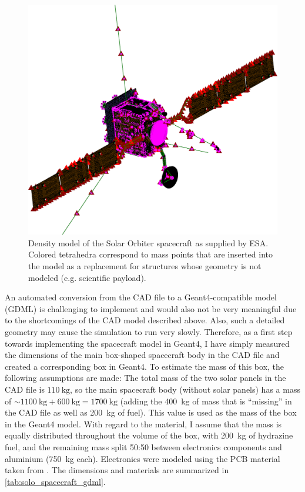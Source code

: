 \begin{figure}
	\centering
	\includegraphics[width=0.7\linewidth]{images/solo_spacecraft_model}
	\caption[Density model of the Solar Orbiter spacecraft]{Density model of the Solar Orbiter spacecraft as supplied by ESA. Colored tetrahedra correspond to mass points that are inserted into the model as a replacement for structures whose geometry is not modeled (e.g. scientific payload).}
	\label{fig:solo_spacecraft_model}
\end{figure}

An automated conversion from the \ac{CAD} file to a \ac{Geant4}-compatible model (GDML) is challenging to implement and would also not be very meaningful due to the shortcomings of the \ac{CAD} model described above. Also, such a detailed geometry may cause the simulation to run very slowly.
Therefore, as a first step towards implementing the spacecraft model in \ac{Geant4}, I have simply measured the dimensions of the main box-shaped spacecraft body in the \ac{CAD} file and created a corresponding box in \ac{Geant4}. To estimate the mass of this box, the following assumptions are made: 
The total mass of the two solar panels in the \ac{CAD} file is $\SI{110}{\kilo\gram}$, so the main spacecraft body (without solar panels) has a mass of $\sim\SI{1100}{\kilogram} + \SI{600}{\kilogram} = \SI{1700}{\kilogram}$ (adding the \SI{400}{\kilogram} of mass that is ``missing'' in the \ac{CAD} file as well as \SI{200}{\kilogram} of fuel). This value is used as the mass of the box in the \ac{Geant4} model.
With regard to the material, I assume that the mass is equally distributed throughout the volume of the box, with \SI{200}{\kilogram} of hydrazine fuel, and the remaining mass split 50:50 between electronics components and aluminium (\SI{750}{\kilogram} each). Electronics were modeled using the \ac{PCB} material taken from \citet{Appel-2018,Appel-2018-PhD}.
The dimensions and materials are summarized in \autoref{tab:solo_spacecraft_gdml}.

